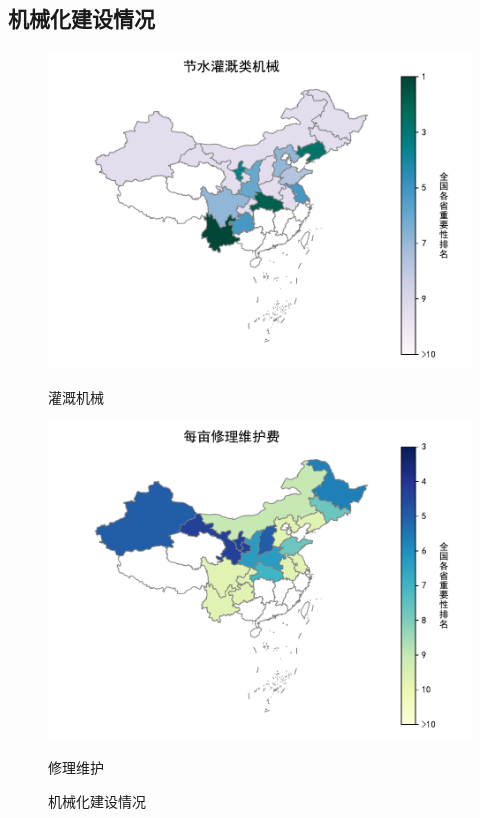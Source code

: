   \subsection{机械化建设情况}
  \begin{figure}[htb]
      \centering
      \begin{minipage}[t]{0.49\linewidth}
        \centering
        \includegraphics[width=\linewidth]{figs/Mechanization_IrrigationMachinery}
        \caption{灌溉机械}
        \label{fig:Mechanization_IrrigationMachinery}
      \end{minipage}
      \hfill
      \begin{minipage}[t]{0.49\linewidth}
        \centering
        \includegraphics[width=\linewidth]{figs/Mechanization_Repair}
        \caption{修理维护}
        \label{fig:Mechanization_Repair}
      \end{minipage}
      \caption{机械化建设情况}
      \label{fig:Mechanization}
    \end{figure}

